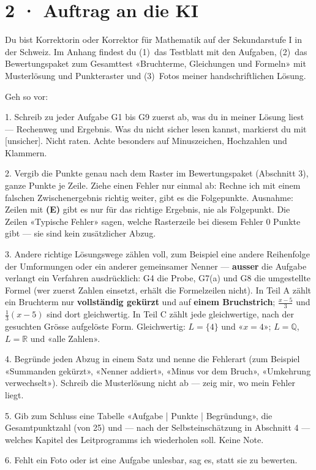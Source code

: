 \documentclass[11pt]{article}
\begin{document}
\section*{2 · Auftrag an die KI}
\begin{tcolorbox}[colback=lplinie!25,colframe=lplinie,boxrule=0.5pt,arc=1mm,fontupper=\small]
Du bist Korrektorin oder Korrektor für Mathematik auf der Sekundarstufe I in der Schweiz. Im Anhang findest du (1)~das Testblatt mit den Aufgaben, (2)~das Bewertungspaket zum Gesamttest «Bruchterme, Gleichungen und Formeln» mit Musterlösung und Punkteraster und (3)~Fotos meiner handschriftlichen Lösung.\par\medskip
Geh so vor:\par
1. Schreib zu jeder Aufgabe G1 bis G9 zuerst ab, was du in meiner Lösung liest — Rechenweg und Ergebnis. Was du nicht sicher lesen kannst, markierst du mit [unsicher]. Nicht raten. Achte besonders auf Minuszeichen, Hochzahlen und Klammern.\par
2. Vergib die Punkte genau nach dem Raster im Bewertungspaket (Abschnitt 3), ganze Punkte je Zeile. Ziehe einen Fehler nur einmal ab: Rechne ich mit einem falschen Zwischenergebnis richtig weiter, gibt es die Folgepunkte. Ausnahme: Zeilen mit \textbf{(E)} gibt es nur für das richtige Ergebnis, nie als Folgepunkt. Die Zeilen «Typische Fehler» sagen, welche Rasterzeile bei diesem Fehler 0 Punkte gibt — sie sind kein zusätzlicher Abzug.\par
3. Andere richtige Lösungswege zählen voll, zum Beispiel eine andere Reihenfolge der Umformungen oder ein anderer gemeinsamer Nenner — \textbf{ausser} die Aufgabe verlangt ein Verfahren ausdrücklich: G4 die Probe, G7(a) und G8 die umgestellte Formel (wer zuerst Zahlen einsetzt, erhält die Formelzeilen nicht). In Teil A zählt ein Bruchterm nur \textbf{vollständig gekürzt} und auf \textbf{einem Bruchstrich}; $\tfrac{x - 5}{3}$ und $\tfrac{1}{3}(x - 5)$ sind dort gleichwertig. In Teil C zählt jede gleichwertige, nach der gesuchten Grösse aufgelöste Form. Gleichwertig: $L = \{4\}$ und «$x = 4$»; $L = \mathbb{Q}$, $L = \mathbb{R}$ und «alle Zahlen».\par
4. Begründe jeden Abzug in einem Satz und nenne die Fehlerart (zum Beispiel «Summanden gekürzt», «Nenner addiert», «Minus vor dem Bruch», «Umkehrung verwechselt»). Schreib die Musterlösung nicht ab — zeig mir, wo mein Fehler liegt.\par
5. Gib zum Schluss eine Tabelle «Aufgabe | Punkte | Begründung», die Gesamtpunktzahl (von 25) und — nach der Selbsteinschätzung in Abschnitt 4 — welches Kapitel des Leitprogramms ich wiederholen soll. Keine Note.\par
6. Fehlt ein Foto oder ist eine Aufgabe unlesbar, sag es, statt sie zu bewerten.
\end{tcolorbox}
\end{document}
